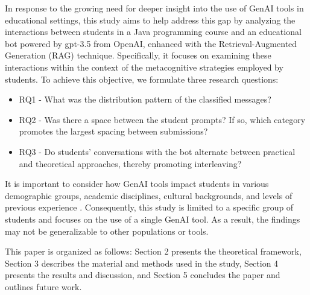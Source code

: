 \documentclass[a4paper,twoside]{article}
\begin{document}
In response to the growing need for deeper insight into the use of GenAI tools
in educational settings, this study aims to help address this gap by analyzing
the interactions between students in a Java programming course and an
educational bot powered by gpt-3.5 from OpenAI, enhanced with the
Retrieval-Augmented Generation (RAG) technique. Specifically, it focuses on
examining these interactions within the context of the metacognitive strategies
employed by students. To achieve this objective, we formulate three research
questions:

\begin{itemize}
  \item RQ1 - What was the distribution pattern of the classified messages?
  \item RQ2 - Was there a space between the student prompts? If so, which
  category promotes the largest spacing between submissions?
  \item RQ3 - Do students' conversations with the bot alternate between
  practical and theoretical approaches, thereby promoting interleaving?
\end{itemize}


It is important to consider how GenAI tools impact students in
various demographic groups, academic disciplines, cultural backgrounds, and
levels of previous experience \citep{catalan21} \citep{neo22}. Consequently,
this study is limited to a specific group of students and focuses on the use of
a single GenAI tool. As a result, the findings may not be generalizable to other
populations or tools.

This paper is organized as follows: Section 2 presents the theoretical
framework, Section 3 describes the material and methods used in the study,
Section 4 presents the results and discussion, and Section 5 concludes the
paper and outlines future work.


\end{document}
